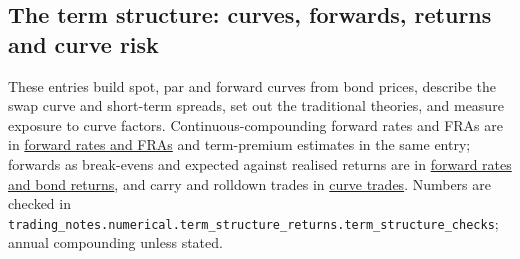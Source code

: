 \subsection{The term structure: curves, forwards, returns and curve risk}

These entries build spot, par and forward curves from bond prices, describe the swap curve and short-term spreads, set out the traditional theories, and measure exposure to curve factors. Continuous-compounding forward rates and FRAs are in \hyperref[mod:forward-rates-fra]{forward rates and FRAs} and term-premium estimates in the same entry; forwards as break-evens and expected against realised returns are in \hyperref[meth:forward-rates-expected-returns]{forward rates and bond returns}, and carry and rolldown trades in \hyperref[meth:curve-trades-carry-rolldown]{curve trades}. Numbers are checked in \nolinkurl{trading_notes.numerical.term_structure_returns.term_structure_checks}; annual compounding unless stated.

